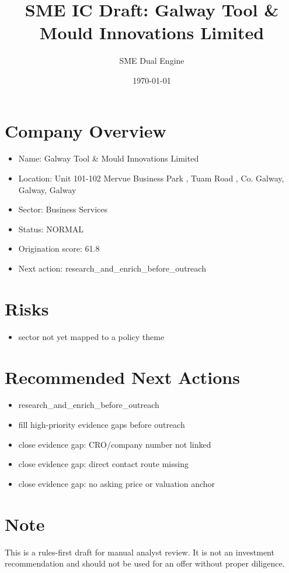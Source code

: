 \documentclass[11pt,a4paper]{article}
\title{SME IC Draft: Galway Tool \& Mould Innovations Limited}
\author{SME Dual Engine}
\date{\today}
\begin{document}
\maketitle
\section*{Company Overview}
\begin{itemize}[leftmargin=1.4em]
\item Name: Galway Tool \& Mould Innovations Limited
\item Location: Unit 101-102 Mervue Business Park , Tuam Road , Co. Galway, Galway, Galway
\item Sector: Business Services
\item Status: NORMAL
\item Origination score: 61.8
\item Next action: research\_and\_enrich\_before\_outreach
\end{itemize}
\section*{Risks}
\begin{itemize}[leftmargin=1.4em]
\item sector not yet mapped to a policy theme
\end{itemize}
\section*{Recommended Next Actions}
\begin{itemize}[leftmargin=1.4em]
\item research\_and\_enrich\_before\_outreach
\item fill high-priority evidence gaps before outreach
\item close evidence gap: CRO/company number not linked
\item close evidence gap: direct contact route missing
\item close evidence gap: no asking price or valuation anchor
\end{itemize}
\section*{Note}
This is a rules-first draft for manual analyst review. It is not an investment
recommendation and should not be used for an offer without proper diligence.
\end{document}
